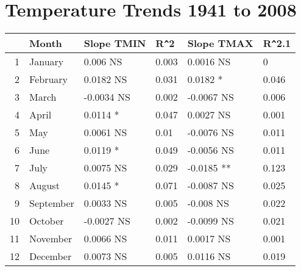 \documentclass{article}\usepackage[]{graphicx}\usepackage[]{color}
\begin{document}
\section*{Temperature Trends 1941 to 2008}
\begin{table}[ht]
\centering
\begin{tabular}{rlllll}
  \hline
 & Month & Slope TMIN & R\verb|^|2 & Slope TMAX & R\verb|^|2.1 \\ 
  \hline
1 & January & 0.006 NS & 0.003 & 0.0016 NS & 0 \\ 
  2 & February & 0.0182 NS & 0.031 & 0.0182 * & 0.046 \\ 
  3 & March & -0.0034 NS & 0.002 & -0.0067 NS & 0.006 \\ 
  4 & April & 0.0114 * & 0.047 & 0.0027 NS & 0.001 \\ 
  5 & May & 0.0061 NS & 0.01 & -0.0076 NS & 0.011 \\ 
  6 & June & 0.0119 * & 0.049 & -0.0056 NS & 0.011 \\ 
  7 & July & 0.0075 NS & 0.029 & -0.0185 ** & 0.123 \\ 
  8 & August & 0.0145 * & 0.071 & -0.0087 NS & 0.025 \\ 
  9 & September & 0.0033 NS & 0.005 & -0.008 NS & 0.022 \\ 
  10 & October & -0.0027 NS & 0.002 & -0.0099 NS & 0.021 \\ 
  11 & November & 0.0066 NS & 0.011 & 0.0017 NS & 0.001 \\ 
  12 & December & 0.0073 NS & 0.005 & 0.0116 NS & 0.019 \\ 
   \hline
\end{tabular}
\end{table}
\end{document}
